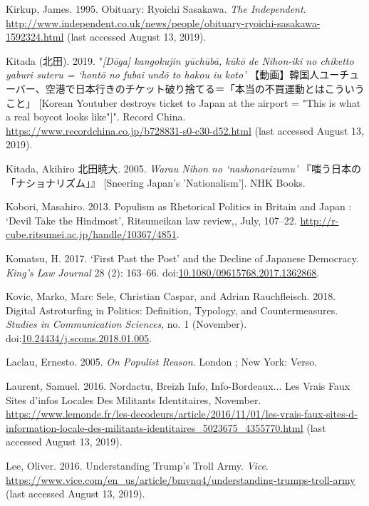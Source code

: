 \documentclass[10pt,british,A4paper,oneside]{memoir}
\begin{document}
\hypertarget{ref-kirkup_obituary:_1995}{}
Kirkup, James. 1995. Obituary: Ryoichi Sasakawa. \emph{The Independent}.
\url{http://www.independent.co.uk/news/people/obituary-ryoichi-sasakawa-1592324.html} (last accessed August 13, 2019).

\hypertarget{ref-kitada_eng._2019}{}
Kitada (北田). 2019. "\emph{[Dōga] kangokujin yūchūbā, kūkō de Nihon-iki no chiketto yaburi suteru = `hontō no fubai undō to hakou iu koto'} 【動画】韓国人ユーチューバー、空港で日本行きのチケット破り捨てる＝「本当の不買運動とはこういうこと」 [Korean Youtuber destroys ticket to Japan at the airport = "This is what a real boycot looks like"]".
Record China. \url{https://www.recordchina.co.jp/b728831-s0-c30-d52.html} (last accessed August 13, 2019).

\hypertarget{ref-kitada_eng:_2005}{}
Kitada, Akihiro 北田暁大. 2005. \emph{Warau Nihon no `nashonarizumu'} 『嗤う日本の「ナショナリズム」』 [Sneering Japan's 'Nationalism'].
NHK Books.

\hypertarget{ref-kobori_populism_2013}{}
Kobori, Masahiro. 2013. Populism as Rhetorical Politics in Britain and
Japan : `Devil Take the Hindmost', Ritsumeikan law review,, July,
107--22. \url{http://r-cube.ritsumei.ac.jp/handle/10367/4851}.

\hypertarget{ref-komatsu_first_2017}{}
Komatsu, H. 2017. `First Past the Post' and the Decline of Japanese
Democracy. \emph{King's Law Journal} 28 (2): 163--66.
doi:\href{https://doi.org/10.1080/09615768.2017.1362868}{10.1080/09615768.2017.1362868}.

\hypertarget{ref-kovic_digital_2018}{}
Kovic, Marko, Marc Sele, Christian Caspar, and Adrian Rauchfleisch.
2018. Digital Astroturfing in Politics: Definition, Typology, and
Countermeasures. \emph{Studies in Communication Sciences}, no. 1
(November).
doi:\href{https://doi.org/10.24434/j.scoms.2018.01.005}{10.24434/j.scoms.2018.01.005}.

\hypertarget{ref-laclau_populist_2005}{}
Laclau, Ernesto. 2005. \emph{On Populist Reason}. London ; New York:
Verso.

\hypertarget{ref-laurent_nordactu_2016}{}
Laurent, Samuel. 2016. Nordactu, Breizh Info, Info-Bordeaux... Les Vrais
Faux Sites d'infos Locales Des Militants Identitaires, November.
\url{https://www.lemonde.fr/les-decodeurs/article/2016/11/01/les-vrais-faux-sites-d-information-locale-des-militants-identitaires_5023675_4355770.html} (last accessed August 13, 2019).

\hypertarget{ref-lee_understanding_2016}{}
Lee, Oliver. 2016. Understanding Trump's Troll Army. \emph{Vice}.
\url{https://www.vice.com/en_us/article/bmvnq4/understanding-trumps-troll-army} (last accessed August 13, 2019).
\end{document}
